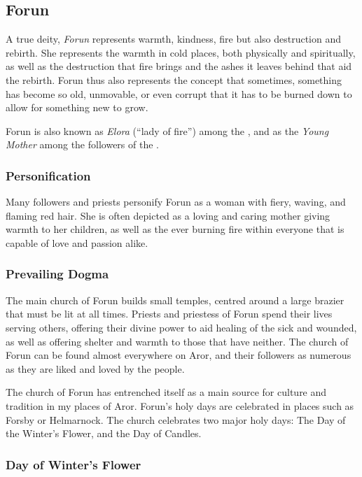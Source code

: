 \subsection{Forun}
\label{sec:Forun}

A true deity, \emph{Forun} represents warmth, kindness, fire but also
destruction and rebirth. She represents the warmth in cold places, both
physically and spiritually, as well as the destruction that fire brings and
the ashes it leaves behind that aid the rebirth. Forun thus also represents
the concept that sometimes, something has become so old, unmovable, or even
corrupt that it has to be burned down to allow for something new to grow.

Forun is also known as \emph{Elora} (``lady of fire'') among the
, and as the \emph{Young Mother} among the followers of
the .

\subsubsection*{Personification}

Many followers and priests personify Forun as a woman with fiery, waving, and
flaming red hair. She is often depicted as a loving and caring mother giving
warmth to her children, as well as the ever burning fire within everyone that
is capable of love and passion alike.

\subsubsection*{Prevailing Dogma}

The main church of Forun builds small temples, centred around a large brazier
that must be lit at all times. Priests and priestess of Forun spend their
lives serving others, offering their divine power to aid healing of the sick
and wounded, as well as offering shelter and warmth to those that have
neither. The church of Forun can be found almost everywhere on Aror, and their
followers as numerous as they are liked and loved by the people.

The church of Forun has entrenched itself as a main source for culture and
tradition in my places of Aror. Forun's holy days are celebrated in places
such as Forsby or Helmarnock. The church celebrates two major holy days: The
Day of the Winter's Flower, and the Day of Candles.

\subsubsection*{Day of Winter's Flower}

